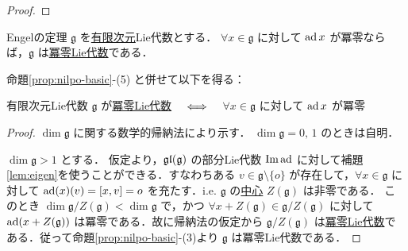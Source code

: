 \documentclass[rep_main]{subfiles}
\begin{document}
\begin{proof}
\end{proof}


\begin{mytheo}[label=thm:Engel]{Engelの定理}
    $\mathfrak{g}$ を\underline{有限次元}Lie代数とする．
    $\forall x \in \mathfrak{g}$ に対して $\operatorname{ad} x$ が冪零ならば，$\mathfrak{g}$ は\hyperref[def:nilpotent-LieAlg]{冪零Lie代数}である．
\end{mytheo}

\begin{marker}
    命題\ref{prop:nilpo-basic}-(5) と併せて以下を得る：

    有限次元Lie代数 $\mathfrak{g}$ が\hyperref[def:nilpotent-LieAlg]{冪零Lie代数} $\quad \Longleftrightarrow \quad$ $\forall x \in \mathfrak{g}$ に対して $\operatorname{ad} x$ が冪零
\end{marker}

\begin{proof}
    $\dim \mathfrak{g}$ に関する数学的帰納法により示す．
    $\dim \mathfrak{g} = 0,\, 1$ のときは自明．

    $\dim \mathfrak{g} > 1$ とする．
    仮定より，$\mathfrak{gl} (\mathfrak{g})$ の部分Lie代数 $\Im \operatorname{ad}$ に対して補題\ref{lem:eigen}を使うことができる．すなわちある $v \in \mathfrak{g} \setminus \{o\}$ が存在して，$\forall x \in \mathfrak{g}$ に対して $\ad(x)(v) = \comm{x}{v} = o$ を充たす．i.e. $\mathfrak{g}$ の\hyperref[def:center-LieAlg]{中心} $Z(\mathfrak{g})$ は非零である．
    このとき $\dim \mathfrak{g} / Z(\mathfrak{g}) < \dim \mathfrak{g}$ で，かつ $\forall x + Z(\mathfrak{g}) \in \mathfrak{g} / Z(\mathfrak{g})$ に対して $\operatorname{ad} (x + Z(\mathfrak{g}))$ は冪零である．故に帰納法の仮定から $\mathfrak{g} / Z(\mathfrak{g})$ は\hyperref[def:nilpotent-LieAlg]{冪零Lie代数}である．従って命題\ref{prop:nilpo-basic}-(3)より $\mathfrak{g}$ は冪零Lie代数である．
\end{proof}
\end{document}
